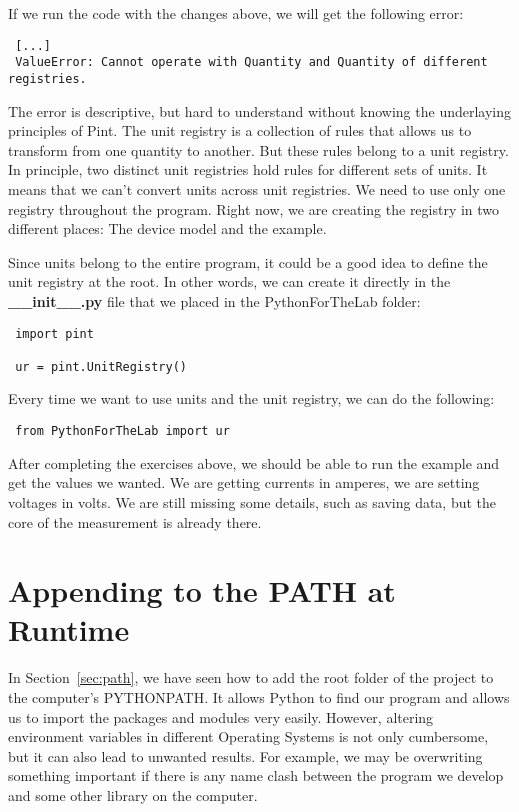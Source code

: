 If we run the code with the changes above, we will get the following error:

\begin{verbatim}
 [...]
 ValueError: Cannot operate with Quantity and Quantity of different registries.
\end{verbatim}

The error is descriptive, but hard to understand without knowing the underlaying principles of Pint. The unit registry is a collection of rules that allows us to transform from one quantity to another. But these rules belong to a unit registry. In principle, two distinct unit registries hold rules for different sets of units. It means that we can't convert units across unit registries. We need to use only one registry throughout the program. Right now, we are creating the registry in two different places: The device model and the example.

Since units belong to the entire program, it could be a good idea to define the unit registry at the root. In other words, we can create it directly in the \textbf{\_\_init\_\_.py} file that we placed in the PythonForTheLab folder:

\begin{verbatim}
 import pint

 ur = pint.UnitRegistry()
\end{verbatim}

Every time we want to use units and the unit registry, we can do the following:

\begin{verbatim}
 from PythonForTheLab import ur
\end{verbatim}



After completing the exercises above, we should be able to run the example and get the values we wanted. We are getting currents in amperes, we are setting voltages in volts. We are still missing some details, such as saving data, but the core of the measurement is already there.

\section{Appending to the PATH at Runtime}\label{sec:appending-path}
In Section~\ref{sec:path}, we have seen how to add the root folder of the project to the computer's PYTHONPATH. It allows Python to find our program and allows us to import the packages and modules very easily. However, altering environment variables in different Operating Systems is not only cumbersome, but it can also lead to unwanted results. For example, we may be overwriting something important if there is any name clash between the program we develop and some other library on the computer.


